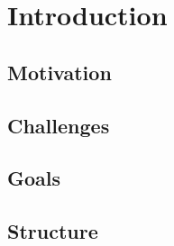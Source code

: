 \chapter{Introduction}
\label{cha:Introduction}

\section{Motivation}

\section{Challenges}

\section{Goals}

\section{Structure}



